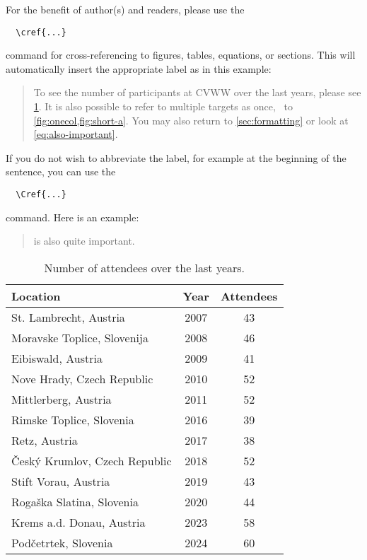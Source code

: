 For the benefit of author(s) and readers, please use the
{\small\begin{verbatim}
  \cref{...}
\end{verbatim}}
\noindent
command for cross-referencing to figures, tables, equations, or sections.
This will automatically insert the appropriate label as in this example:
\begin{quotation}
  To see the number of participants at CVWW over the last years, please see \cref{tab:participants}.
  It is also possible to refer to multiple targets as once, \eg~to \cref{fig:onecol,fig:short-a}.
  You may also return to \cref{sec:formatting} or look at \cref{eq:also-important}.
\end{quotation}
If you do not wish to abbreviate the label, for example at the beginning of the sentence, you can use the
{\small\begin{verbatim}
  \Cref{...}
\end{verbatim}}
\noindent
command. Here is an example:
\begin{quotation}
   is also quite important.
\end{quotation}

\begin{table}
   \centering
   \begin{tabular}{|l|c|c|}
   \hline
    Location & Year & Attendees\\
   \hline\hline
   St. Lambrecht, Austria  & 2007 & 43 \\
   Moravske Toplice, Slovenija & 2008 & 46 \\
   Eibiswald, Austria & 2009 & 41 \\
   Nove Hrady, Czech Republic & 2010 & 52 \\
   Mittlerberg, Austria & 2011 & 52 \\
   Rimske Toplice, Slovenia & 2016 & 39 \\
   Retz, Austria & 2017 & 38 \\
   \v{C}esk\'{y} Krumlov, Czech Republic & 2018 & 52 \\
   Stift Vorau, Austria & 2019 & 43 \\
   Rogaška Slatina, Slovenia & 2020 & 44\\
   Krems a.d. Donau, Austria & 2023 & 58\\
   Pod\v{c}etrtek, Slovenia & 2024 & 60\\
   \hline
   \end{tabular}
   \caption{Number of attendees over the last years. }
   \label{tab:participants}
\end{table}


